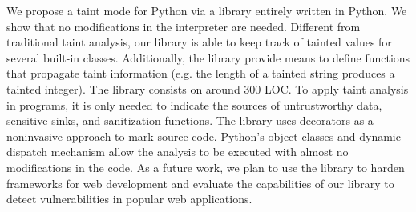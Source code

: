 We propose a taint mode for Python via a library entirely written
in Python.
We show that no modifications in the interpreter are needed. 
Different from traditional taint analysis, our library
is able to 
keep track of tainted values for  
several built-in classes.
Additionally, the library provide means to define functions that 
propagate taint information
(e.g. the length of a tainted string produces a
tainted integer). The library consists on around 300 LOC.
To apply taint analysis in programs, it is only needed 
to indicate the sources of untrustworthy data, sensitive 
sinks, and sanitization functions. The library uses decorators 
as a noninvasive approach to mark source code. 
Python's object classes 
and dynamic dispatch mechanism allow the analysis to be executed with almost no modifications
in the  code. %
As a future work, we plan to use the library to harden frameworks
for web development and evaluate the capabilities of our library to 
detect vulnerabilities
in popular web applications.
